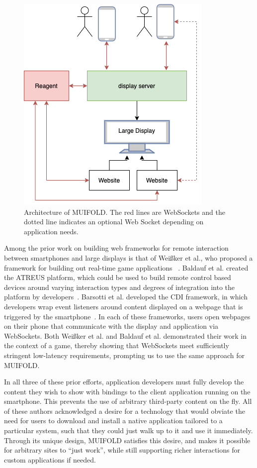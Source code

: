 \begin{figure}
\centering
  \includegraphics[width=0.6\columnwidth]{chapters/04_muifold/figures/muifold_architecture.png}
  \caption{Architecture of MUIFOLD. The red lines are WebSockets and the dotted line indicates an optional Web Socket depending on application needs.}
  \label{fig:architecture_muifold}
\end{figure}

Among the prior work on building web frameworks for remote interaction between smartphones and large displays is that of
Weißker et al., who proposed a
framework for building out real-time game applications ~\cite{weisker_massive_2016}. Baldauf et al. created the ATREUS
platform, which could be used to build remote control based
devices around varying interaction types and degrees of integration
into the platform by developers~\cite{baldauf_your_2016}. Barsotti
et al. developed the CDI framework, in which developers wrap event listeners around content displayed on a webpage
that is triggered by the smartphone~\cite{barsotti_web_2017}.
In each of these frameworks, users open webpages on their phone that communicate with the display and application via WebSockets.
Both Weißker et al. and Baldauf et al. demonstrated their
work in the context of a game, thereby showing that
WebSockets meet sufficiently stringent low-latency requirements, prompting us to use the same approach for MUIFOLD.

In all three of these prior efforts, application
developers must fully develop the content they wish to show with bindings to the client application running on the smartphone. This prevents the use of arbitrary third-party content on the fly.
All of these authors acknowledged a desire for a technology that would obviate the need for users to download and install a native application tailored to a particular system, such that they could just walk up to it and use it immediately. Through its unique design, MUIFOLD satisfies this desire, and makes it possible for arbitrary sites to ``just work'', while still supporting richer interactions for custom applications if needed.
